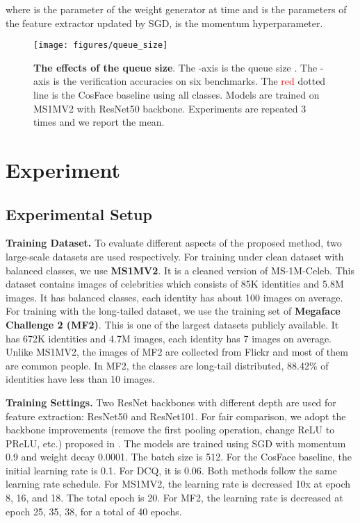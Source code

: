 \documentclass[10pt,twocolumn,letterpaper]{article}
\begin{document}
 where  is the parameter of the weight generator at time  and  is the parameters of the feature extractor updated by SGD,  is the momentum hyperparameter. 

\begin{figure}[t]
   \centering
   \texttt{[image: figures/queue\_size]}
   \caption{\textbf{The effects of the queue size}. The -axis is the queue size . The -axis is the verification accuracies on six benchmarks. The \textcolor{red}{red} dotted line is the CosFace baseline using all classes. Models are trained on MS1MV2 with ResNet50 backbone. Experiments are repeated 3 times and we report the mean. \label{fig:queue_size}}
\end{figure}

\section{Experiment}
\subsection{Experimental Setup}
\textbf{Training Dataset.} To evaluate different aspects of the proposed method, two large-scale datasets are used respectively. For training under clean dataset with balanced classes, we use \textbf{MS1MV2}\cite{deng2019arcface}. It is a cleaned version of MS-1M-Celeb\cite{guo2016ms}. This dataset contains images of celebrities which consists of 85K identities and 5.8M images. It has balanced classes, each identity has about 100 images on average. For training with the long-tailed dataset, we use the training set of \textbf{Megaface Challenge 2 (MF2)}\cite{nech2017level}. This is one of the largest datasets publicly available. It has 672K identities and 4.7M images, each identity has 7 images on average. Unlike MS1MV2, the images of MF2 are collected from Flickr and most of them are common people. In MF2, the classes are long-tail distributed, 88.42\% of identities have less than 10 images. 

\textbf{Training Settings.} Two ResNet\cite{he2016deep} backbones with different depth are used for feature extraction: ResNet50 and ResNet101. For fair comparison, we adopt the backbone improvements (remove the first pooling operation, change ReLU\cite{nair2010rectified} to PReLU\cite{he2015delving}, etc.) proposed in \cite{deng2019arcface}. The models are trained using SGD with momentum 0.9 and weight decay 0.0001. The batch size is 512. For the CosFace baseline, the initial learning rate is 0.1. For DCQ, it is 0.06. Both methods follow the same learning rate schedule. For MS1MV2, the learning rate is decreased 10x at epoch 8, 16, and 18. The total epoch is 20. For MF2, the learning rate is decreased at epoch 25, 35, 38, for a total of 40 epochs.
\end{document}
